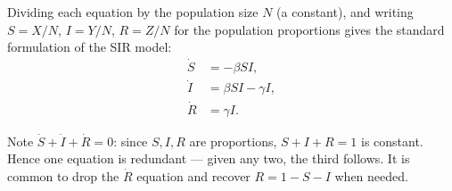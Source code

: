 Dividing each equation by the population size $N$ (a constant), and
writing $S=X/N$, $I=Y/N$, $R=Z/N$ for the population proportions gives
the standard formulation of the SIR model:
\begin{align*}
\dot S &= -\beta S I, \\
\dot I &= \beta S I - \gamma I, \\
\dot R &= \gamma I.
\end{align*}

Note $\dot S+\dot I+\dot R=0$: since $S,I,R$ are proportions,
$S+I+R=1$ is constant. Hence one equation is redundant --- given any
two, the third follows. It is common to drop the $\dot R$ equation and
recover $R=1-S-I$ when needed.

